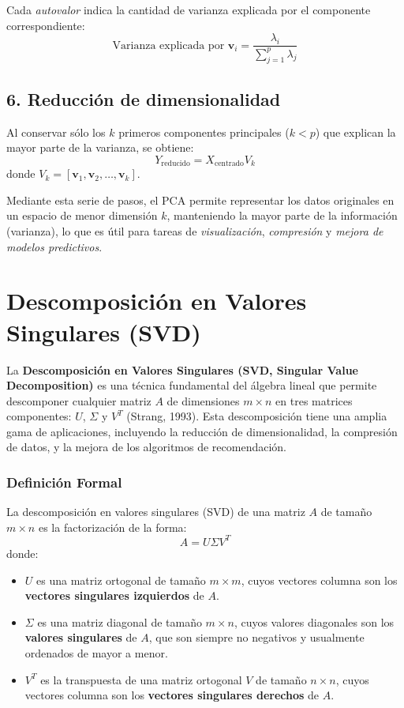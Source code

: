 \documentclass[12pt]{article}
\begin{document}
        Cada \emph{autovalor} indica la cantidad de varianza explicada por el componente correspondiente:
        \[
        \text{Varianza explicada por } \mathbf{v}_i = \frac{\lambda_i}{\sum_{j=1}^p \lambda_j}
        \]
        
        \subsection*{6. Reducción de dimensionalidad}
        
        Al conservar sólo los $ k $ primeros componentes principales ($ k < p $) que explican la mayor parte de la varianza, se obtiene:
        \[
        Y_{\text{reducido}} = X_{\text{centrado}} V_k
        \]
        donde $ V_k = [\mathbf{v}_1, \mathbf{v}_2, \ldots, \mathbf{v}_k] $.
        
        \vspace{1em}
        \noindent
        Mediante esta serie de pasos, el PCA permite representar los datos originales en un espacio de menor dimensión $ k $, manteniendo la mayor parte de la información (varianza), lo que es útil para tareas de \emph{visualización}, \emph{compresión} y \emph{mejora de modelos predictivos}.
        
        \section*{Descomposición en Valores Singulares (SVD)}
        \noindent
        La \textbf{Descomposición en Valores Singulares (SVD, Singular Value Decomposition)} es una técnica fundamental del álgebra lineal que permite descomponer cualquier matriz $A$ de dimensiones $m \times n$ en tres matrices componentes: $U$, $\Sigma$ y $V^T$ (Strang, 1993). Esta descomposición tiene una amplia gama de aplicaciones, incluyendo la reducción de dimensionalidad, la compresión de datos, y la mejora de los algoritmos de recomendación.
        
        \subsubsection*{Definición Formal}
        
        La descomposición en valores singulares (SVD) de una matriz $A$ de tamaño $m \times n$ es la factorización de la forma:
        \[
        A = U \Sigma V^T
        \]
        donde:
        \begin{itemize}
                \item $U$ es una matriz ortogonal de tamaño $m \times m$, cuyos vectores columna son los \textbf{vectores singulares izquierdos} de $A$.
                \item $\Sigma$ es una matriz diagonal de tamaño $m \times n$, cuyos valores diagonales son los \textbf{valores singulares} de $A$, que son siempre no negativos y usualmente ordenados de mayor a menor.
                \item $V^T$ es la transpuesta de una matriz ortogonal $V$ de tamaño $n \times n$, cuyos vectores columna son los \textbf{vectores singulares derechos} de $A$.
        \end{itemize}
        
\end{document}
